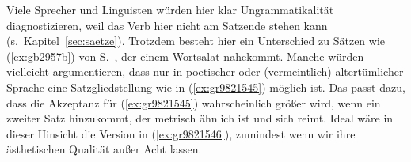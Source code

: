 \begin{exe}
\end{exe}

Viele Sprecher und Linguisten würden hier klar Ungrammatikalität diagnostizieren, weil das Verb hier nicht am Satzende stehen kann (s.\ Kapitel~\ref{sec:saetze}).
Trotzdem besteht hier ein Unterschied zu Sätzen wie (\ref{ex:gb2957b}) von S.\ \pageref{ex:gb2957b}, der einem Wortsalat nahekommt.
Manche würden vielleicht argumentieren, dass nur in poetischer oder (vermeintlich) altertümlicher Sprache eine Satzgliedstellung wie in (\ref{ex:gr9821545}) möglich ist.
Das passt dazu, dass die Akzeptanz für (\ref{ex:gr9821545}) wahrscheinlich größer wird, wenn ein zweiter Satz hinzukommt, der metrisch ähnlich ist und sich reimt.
Ideal wäre in dieser Hinsicht die Version in (\ref{ex:gr9821546}), zumindest wenn wir ihre ästhetischen Qualität außer Acht lassen.

\begin{exe}
\end{exe}

